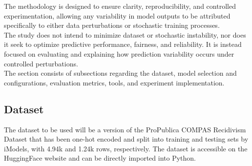 \documentclass[12pt]{article}
\begin{document}
The methodology is designed to ensure clarity, reproducibility, and controlled experimentation, allowing any variability in model outputs to be attributed specifically to either data perturbations or stochastic training processes. \\

The study does not intend to minimize dataset or stochastic instability, nor does it seek to optimize predictive performance, fairness, and reliability. It is instead focused on evaluating and explaining how prediction variability occurs under controlled perturbations. \\

The section consists of subsections regarding the dataset, model selection and configurations, evaluation metrics, tools, and experiment implementation.

\subsection{Dataset} 
\tab The dataset to be used will be a version of the ProPublica COMPAS Recidivism Dataset that has been one-hot encoded and split into training and testing sets by iModels, with 4.94k and 1.24k rows, respectively. The dataset is accessible on the HuggingFace website and can be directly imported into Python.\\
\end{document}
